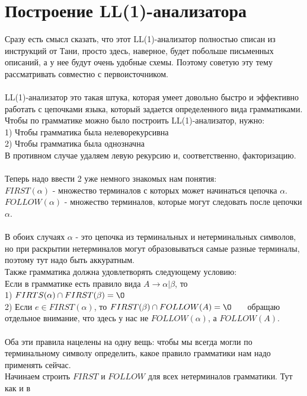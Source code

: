 \documentclass[14pt]{extreport}
\begin{document}
	\chapter{Построение LL(1)-анализатора}
	Сразу есть смысл сказать, что этот LL(1)-анализатор полностью списан из инструкций
	от Тани, просто здесь, наверное, будет побольше письменных описаний, а у нее будут
	очень удобные схемы. Поэтому советую эту тему рассматривать совместно с первоисточником.
	\\\\
	LL(1)-анализатор это такая штука, которая умеет довольно быстро и эффективно работать
	с цепочками языка, который задается определенного вида грамматиками.\\
	Чтобы по грамматике можно было построить LL(1)-анализатор, нужно:\\
	1) Чтобы грамматика была нелеворекурсивна\\
	2) Чтобы грамматика была однозначна\\
	В противном случае удаляем левую рекурсию и, соответственно, факторизацию.\\\\
	Теперь надо ввести 2 уже немного знакомых нам понятия:\\
	$FIRST(\alpha)$ - множество терминалов с которых может начинаться
	цепочка $\alpha$.\\
	$FOLLOW(\alpha)$ - множество терминалов, которые могут следовать после
	цепочки $\alpha$.\\\\
	В обоих случаях $\alpha$ - это цепочка из терминальных и нетерминальных символов,
	но при раскрытии нетерминалов могут образовываться самые разные терминалы, поэтому
	тут надо быть аккуратным.\\
	Также грамматика должна удовлетворять следующему условию:\\
	Если в грамматике есть правило вида $A \to \alpha|\beta $, то\\
	1) $FIRTS(\alpha) \cap FIRST(\beta) = \O$\\
	2) Если $e \in FIRST(\alpha)$, то $FIRST(\beta) \cap FOLLOW(A) = \O$
	\ \ \ обращаю отдельное внимание, что здесь у нас не  $FOLLOW(\alpha)$,
	а $FOLLOW(A)$.\\\\
	Оба эти правила нацелены на одну вещь: чтобы мы всегда могли по терминальному символу
	определить, какое правило грамматики нам надо применять сейчас.\\
	\newpage
	Начинаем строить $FIRST$ и $FOLLOW$ для всех нетерминалов грамматики. Тут как и в
\end{document}
